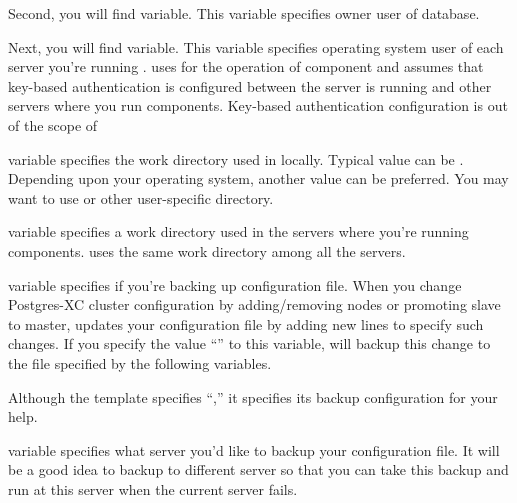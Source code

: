   
      Second, you will find  variable.
      This variable specifies owner user of \XC{} database.
  
  
      Next, you will find  variable.
      This variable specifies operating system user of each server you're running \XC.
       uses  for the operation of \XC{} component and assumes that
      key-based authentication is configured between the server  is running
      and other servers where you run \XC{} components.
      Key-based authentication configuration is out of the scope of 
  
  
       variable specifies the work directory used in  locally.
      Typical value can be .
      Depending upon your operating system, another value can be preferred.
      You may want to use  or other user-specific directory.
  
  
       variable specifies a work directory used in the servers where you're
	  running \XC{} components.
	   uses the same work directory among all the servers.
  
  
       variable specifies if you're backing up configuration file.
      When you change Postgres-XC cluster configuration by adding/removing nodes or promoting
	  slave to master,  updates your configuration file by adding new lines to
	  specify such changes.
      If you specify the value ``'' to this variable,  will backup this
	  change to the file specified by the following variables.
      
      Although the template specifies ``,'' it specifies its backup configuration for your help.
  
  
       variable specifies what server you'd like to backup your
	   configuration file.
      It will be a good idea to backup to different server so that you can take this backup and run
	   at this server when the current  server fails.
  
